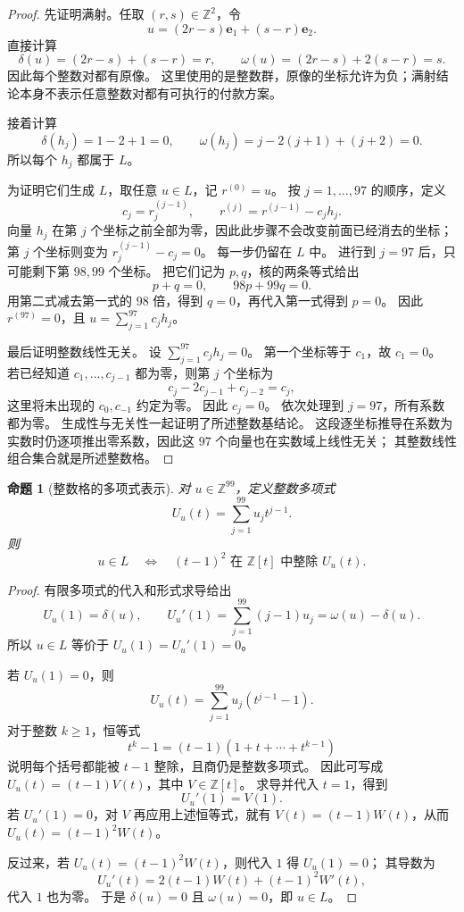 \documentclass[UTF8,a4paper]{ctexbook}
\newtheorem{proposition}[theorem]{命题}
\theoremstyle{definition}
\numberwithin{equation}{chapter}
\newcommand{\1}{\mathbf{1}}
\begin{document}
\begin{proof}
先证明满射。任取 \((r,s)\in\mathbb Z^2\)，令
\[
u=(2r-s)\mathbf e_1+(s-r)\mathbf e_2.
\]
直接计算
\[
\delta(u)=(2r-s)+(s-r)=r,
\qquad
\omega(u)=(2r-s)+2(s-r)=s.
\]
因此每个整数对都有原像。
这里使用的是整数群，原像的坐标允许为负；满射结论本身不表示任意整数对都有可执行的付款方案。

接着计算
\[
\delta(h_j)=1-2+1=0,
\qquad
\omega(h_j)=j-2(j+1)+(j+2)=0.
\]
所以每个 \(h_j\) 都属于 \(L\)。

为证明它们生成 \(L\)，取任意 \(u\in L\)，记 \(r^{(0)}=u\)。
按 \(j=1,\ldots,97\) 的顺序，定义
\[
c_j=r^{(j-1)}_j,
\qquad
r^{(j)}=r^{(j-1)}-c_jh_j.
\]
向量 \(h_j\) 在第 \(j\) 个坐标之前全部为零，因此此步骤不会改变前面已经消去的坐标；
第 \(j\) 个坐标则变为 \(r^{(j-1)}_j-c_j=0\)。
每一步仍留在 \(L\) 中。
进行到 \(j=97\) 后，只可能剩下第 \(98,99\) 个坐标。
把它们记为 \(p,q\)，核的两条等式给出
\[
p+q=0,\qquad98p+99q=0.
\]
用第二式减去第一式的 \(98\) 倍，得到 \(q=0\)，再代入第一式得到 \(p=0\)。
因此 \(r^{(97)}=0\)，且
\(u=\sum_{j=1}^{97}c_jh_j\)。

最后证明整数线性无关。
设 \(\sum_{j=1}^{97}c_jh_j=0\)。
第一个坐标等于 \(c_1\)，故 \(c_1=0\)。
若已经知道 \(c_1,\ldots,c_{j-1}\) 都为零，则第 \(j\) 个坐标为
\[
c_j-2c_{j-1}+c_{j-2}=c_j,
\]
这里将未出现的 \(c_0,c_{-1}\) 约定为零。
因此 \(c_j=0\)。
依次处理到 \(j=97\)，所有系数都为零。
生成性与无关性一起证明了所述整数基结论。
这段逐坐标推导在系数为实数时仍逐项推出零系数，因此这 \(97\) 个向量也在实数域上线性无关；
其整数线性组合集合就是所述整数格。
\end{proof}

\begin{proposition}[整数格的多项式表示]\label{aa:double-root}
对 \(u\in\mathbb Z^{99}\)，定义整数多项式
\[
U_u(t)=\sum_{j=1}^{99}u_jt^{j-1}.
\]
则
\[
u\in L
\quad\Longleftrightarrow\quad
(t-1)^2\text{ 在 }\mathbb Z[t]\text{ 中整除 }U_u(t).
\]
\end{proposition}

\begin{proof}
有限多项式的代入和形式求导给出
\[
U_u(1)=\delta(u),\qquad
U_u'(1)=\sum_{j=1}^{99}(j-1)u_j=\omega(u)-\delta(u).
\]
所以 \(u\in L\) 等价于
\(U_u(1)=U_u'(1)=0\)。

若 \(U_u(1)=0\)，则
\[
U_u(t)=\sum_{j=1}^{99}u_j(t^{j-1}-1).
\]
对于整数 \(k\ge1\)，恒等式
\[
t^k-1=(t-1)(1+t+\cdots+t^{k-1})
\]
说明每个括号都能被 \(t-1\) 整除，且商仍是整数多项式。
因此可写成 \(U_u(t)=(t-1)V(t)\)，其中 \(V\in\mathbb Z[t]\)。
求导并代入 \(t=1\)，得到
\[
U_u'(1)=V(1).
\]
若 \(U_u'(1)=0\)，对 \(V\) 再应用上述恒等式，就有
\(V(t)=(t-1)W(t)\)，从而 \(U_u(t)=(t-1)^2W(t)\)。

反过来，若 \(U_u(t)=(t-1)^2W(t)\)，则代入 \(1\) 得 \(U_u(1)=0\)；
其导数为
\[
U_u'(t)=2(t-1)W(t)+(t-1)^2W'(t),
\]
代入 \(1\) 也为零。
于是 \(\delta(u)=0\) 且 \(\omega(u)=0\)，即 \(u\in L\)。
\end{proof}
\end{document}
